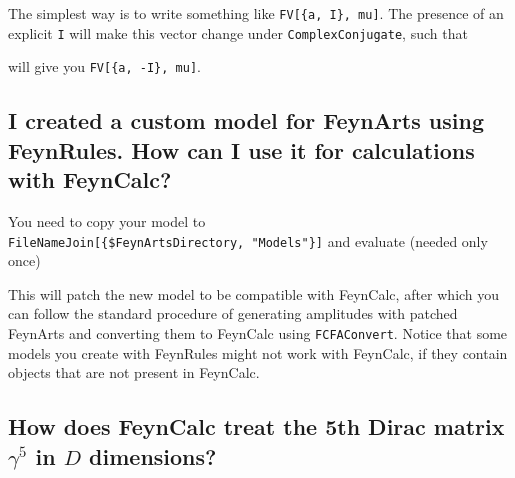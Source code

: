 \documentclass[../FeynCalcManual.tex]{subfiles}
\begin{document}
The simplest way is to write something like
\texttt{FV[\allowbreak{}\{\allowbreak{}a,\ \allowbreak{}I\},\ \allowbreak{}mu]}.
The presence of an explicit \texttt{I} will make this vector change
under \texttt{ComplexConjugate}, such that

\begin{Shaded}
\begin{Highlighting}[]
\OperatorTok{[}\OperatorTok{[\{}\OperatorTok{,}\OperatorTok{\},}\OperatorTok{]]}\SpecialCharTok{//}
\end{Highlighting}
\end{Shaded}

will give you
\texttt{FV[\allowbreak{}\{\allowbreak{}a,\ \allowbreak{}-I\},\ \allowbreak{}mu]}.

\subsection{I created a custom model for FeynArts using FeynRules. How
can I use it for calculations with
FeynCalc?}\label{i-created-a-custom-model-for-feynarts-using-feynrules.-how-can-i-use-it-for-calculations-with-feyncalc}

You need to copy your model to
\texttt{FileNameJoin[\allowbreak{}\{\allowbreak{}\$FeynArtsDirectory,\ \allowbreak{}"Models"\}]}
and evaluate (needed only once)

\begin{Shaded}
\begin{Highlighting}[]
\OperatorTok{[}\OtherTok{{-}\textgreater{}} \OperatorTok{]}\NormalTok{;}
\end{Highlighting}
\end{Shaded}

This will patch the new model to be compatible with FeynCalc, after
which you can follow the standard procedure of generating amplitudes
with patched FeynArts and converting them to FeynCalc using
\texttt{FCFAConvert}. Notice that some models you create with FeynRules
might not work with FeynCalc, if they contain objects that are not
present in FeynCalc.

\subsection{\texorpdfstring{How does FeynCalc treat the 5th Dirac matrix
\(\gamma^5\) in \(D\)
dimensions?}{How does FeynCalc treat the 5th Dirac matrix \textbackslash gamma\^{}5 in D dimensions?}}\label{how-does-feyncalc-treat-the-5th-dirac-matrix-gamma5-in-d-dimensions}
\end{document}
